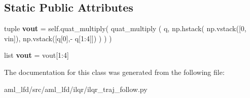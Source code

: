 \subsection*{Static Public Attributes}
\begin{DoxyCompactItemize}
\item 
\hypertarget{classaml__lfd_1_1ilqr_1_1ilqr__traj__follow_1_1_d_d_p___traj_follow_class_a46ee912e03e87a01ae53303079b3bed2}{tuple {\bfseries vout} = self.\-quat\-\_\-multiply( quat\-\_\-multiply ( q, np.\-hstack( np.\-vstack(\mbox{[}0, vin\mbox{]}), np.\-vstack(\mbox{[}q\mbox{[}0\mbox{]},-\/ q\mbox{[}1\-:4\mbox{]}\mbox{]}) ) ) )}\label{classaml__lfd_1_1ilqr_1_1ilqr__traj__follow_1_1_d_d_p___traj_follow_class_a46ee912e03e87a01ae53303079b3bed2}

\item 
\hypertarget{classaml__lfd_1_1ilqr_1_1ilqr__traj__follow_1_1_d_d_p___traj_follow_class_a16c4553ec373478e5f8aae0802a9a198}{list {\bfseries vout} = vout\mbox{[}1\-:4\mbox{]}}\label{classaml__lfd_1_1ilqr_1_1ilqr__traj__follow_1_1_d_d_p___traj_follow_class_a16c4553ec373478e5f8aae0802a9a198}

\end{DoxyCompactItemize}


The documentation for this class was generated from the following file\-:\begin{DoxyCompactItemize}
\item 
aml\-\_\-lfd/src/aml\-\_\-lfd/ilqr/ilqr\-\_\-traj\-\_\-follow.\-py\end{DoxyCompactItemize}
